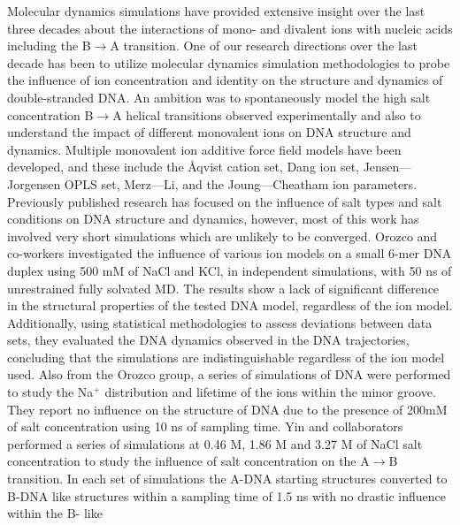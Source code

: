 \documentclass[9pt,lessons]{livecoms}
\begin{document}
Molecular dynamics simulations have provided extensive insight over
the last three decades about the interactions of mono-\cite{Cheatham3rd2013,feig,hamelberg1} and divalent
ions with nucleic acids\cite{Cheatham3rd2013,panteva1} including the
B$\rightarrow$A
transition\cite{Cheatham3rd1997,Cheatham3rd1996,mazurak,pastor,Kulkarni2017}. One of
our research directions over the last decade has been to utilize
molecular dynamics simulation methodologies to probe the influence of
ion concentration and identity on the structure and dynamics of
double-stranded DNA. An ambition was to spontaneously model the high
salt concentration B$\rightarrow$A helical transitions observed
experimentally and also to understand the impact of different
monovalent ions on DNA structure and dynamics.  Multiple monovalent
ion additive force field models have been developed\cite{mamatkulov,liwang,jeejoongyoo}, and these include
the Åqvist cation set\cite{Aqvist1990}, Dang ion set\cite{Smith1994},
Jensen—Jorgensen OPLS set\cite{Zichi1995}, Merz—Li\cite{Merzions}, and the
Joung—Cheatham ion parameters\cite{Joung2008,Joung2008a}.  Previously
published research has focused on the influence of salt types and salt
conditions on DNA structure and dynamics, however, most of this work
has involved very short simulations which are unlikely to be
converged. Orozco and co-workers investigated the influence of various
ion models on a small 6-mer DNA duplex using 500 mM of NaCl and KCl, in independent simulations, with 50
ns of unrestrained fully solvated MD. The results show a lack
of significant difference in the structural properties of the tested
DNA model, regardless of the ion model. Additionally, using
statistical methodologies to assess deviations between data sets, they
evaluated the DNA dynamics observed in the DNA trajectories,
concluding that the simulations are indistinguishable regardless of
the ion model used\cite{modesto09}. Also from the Orozco group, a
series of simulations of DNA were performed to study the Na$^{+}$
distribution and lifetime of the ions within the minor
groove\cite{Rueda2004}. They report no influence on the structure of
DNA due to the presence of 200mM of salt concentration using 10 ns of
sampling time. Yin and collaborators performed a series of simulations
at 0.46 M, 1.86 M and 3.27 M of NaCl salt concentration to study the
influence of salt concentration on the A$\rightarrow$B
transition\cite{Song2006}.  In each set of simulations the A-DNA
starting structures converted to B-DNA like structures within a
sampling time of 1.5 ns with no drastic influence within the B- like
\end{document}
